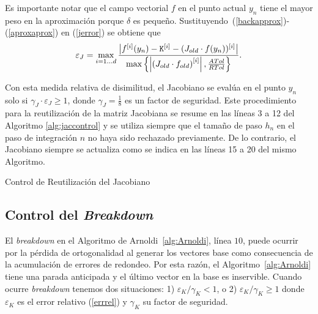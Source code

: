 Es importante notar que el campo vectorial $f$ en el punto actual $y_n$ tiene el mayor peso en la aproximación porque $\delta$
es pequeño. Sustituyendo~(\ref{backapprox})-(\ref{aproxaprox}) en (\ref{jerror}) se obtiene que
\begin{equation}\label{jerroraprox}
    \varepsilon_J = \max_{i=1\ldots d}\frac{\left\lvert f^{[i]}(y_n) - \mathtt{K}^{[i]} - (J_{old}\cdot f(y_n))^{[i]} \right\rvert}
    {\max\left\{ \left\lvert  \left(J_{old}\cdot f_{old}\right)^{[i]}  \right\rvert ,\frac{ATol}{RTol} \right\}}.
\end{equation}

Con esta medida relativa de disimilitud, el Jacobiano se evalúa en el punto $y_n$ solo si $\gamma_J \cdot \varepsilon_J \geq 1$, donde $\gamma_J=\frac{1}{8}$ es un factor de seguridad. Este procedimiento para la reutilización de la matriz Jacobiana se resume en las líneas 3 a 12 del Algoritmo \ref{alg:jaccontrol} y se utiliza siempre que el tamaño de paso $h_n$ en el paso de integración $n$ no haya sido rechazado previamente. De lo contrario, el Jacobiano siempre se actualiza como se indica en las líneas 15 a 20 del mismo Algoritmo.

{\SetAlgoNoLine
\begin{algorithm}[htb]
	\caption{Control de Reutilización del Jacobiano}
	\label{alg:jaccontrol}
	{
	}
\end{algorithm}
}

\subsection{Control del \textit{Breakdown}}\label{sec:brcontrol}
El \emph{breakdown} en el Algoritmo de Arnoldi~\ref{alg:Arnoldi}, línea $10$, puede ocurrir por la pérdida de ortogonalidad al generar los vectores base como consecuencia de la acumulación de errores de redondeo. Por esta razón, el Algoritmo~\ref{alg:Arnoldi} tiene una parada anticipada y el último vector en la base es inservible. Cuando ocurre \emph{breakdown} tenemos dos situaciones: 1) $\varepsilon_{K}/\gamma_K< 1$, o 2) $\varepsilon_{K}/\gamma_K \geq 1$ donde $\varepsilon_{K}$ es el error relativo (\ref{errrel}) y $\gamma_K$ su factor de seguridad.

